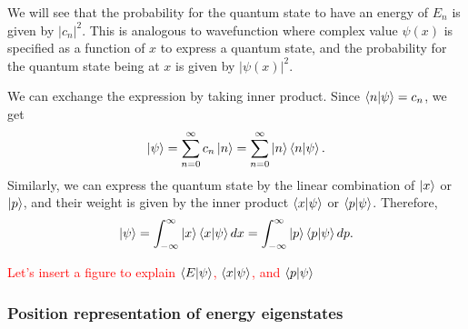 \documentclass{book}
\begin{document}
We will see that the probability for the quantum state to have an energy of $E_n$ is given by $|c_n|^2$. This is analogous to wavefunction where complex value $\psi(x)$ is specified as a function of $x$ to express a quantum state, and the probability for the quantum state being at $x$ is given by $|\psi(x)|^2$.

We can exchange the expression by taking inner product. Since $\braket {n|\psi} = c_n$, we get
\begin{equation}
  \ket \psi = \sum_{n=0}^{\infty}c_n\ket n = \sum_{n=0}^{\infty}\ket n \braket{n|\psi}.
\end{equation}
Similarly, we can express the quantum state by the linear combination of $\ket x$ or $\ket p$, and their weight is given by the inner product $\braket {x|\psi}$ or $\braket{p|\psi}$. Therefore,
\begin{equation}
  \ket \psi = \int_{-\infty}^{\infty}\ket x \braket{x|\psi}dx = \int_{-\infty}^{\infty}\ket p \braket {p|\psi}dp.
\end{equation}


\textcolor{red}{Let's insert a figure to explain $\braket {E|\psi}$, $\braket {x|\psi}$, and $\braket{p|\psi}$}

\subsubsection{Position representation of energy eigenstates}
\end{document}
